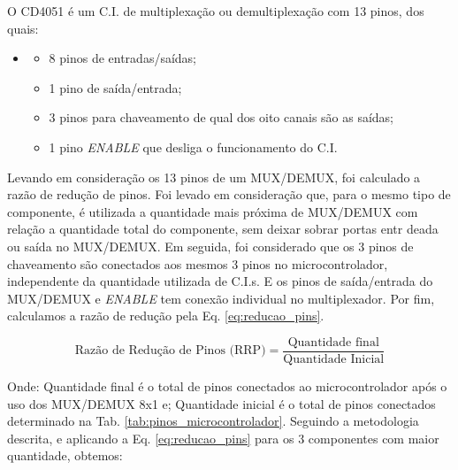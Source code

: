     O CD4051 é um C.I. de multiplexação ou demultiplexação com 13 pinos, dos quais: 
    
    \begin{itemize}
    	\item[]
    	\begin{itemize}
    		\item 8 pinos de entradas/saídas;
    		\item 1 pino de saída/entrada;
    		\item 3 pinos para chaveamento de qual dos oito canais são as saídas;
    		\item 1 pino \textit{ENABLE} que desliga o funcionamento do C.I.
    	\end{itemize}
    \end{itemize}
    
    
    Levando em consideração os 13 pinos de um MUX/DEMUX, foi calculado a razão de redução de pinos. Foi levado em consideração que, para o mesmo tipo de componente, é utilizada a quantidade mais próxima de MUX/DEMUX com relação a quantidade total do componente, sem deixar sobrar portas entr deada ou saída no MUX/DEMUX. Em seguida, foi considerado que os 3 pinos de chaveamento são conectados aos mesmos 3 pinos no microcontrolador, independente da quantidade utilizada de C.I.s. E os pinos de saída/entrada do MUX/DEMUX e \textit{ENABLE} tem conexão individual no multiplexador. Por fim, calculamos a razão de redução pela Eq. \ref{eq:reducao_pins}.
    
    \begin{equation}\label{eq:reducao_pins}
        \text{Razão de Redução de Pinos (RRP)} = \frac{\text{Quantidade final}}{\text{Quantidade Inicial}}
    \end{equation}
    
    Onde: Quantidade final é o total de pinos conectados ao microcontrolador após o uso dos MUX/DEMUX 8x1 e; Quantidade inicial é o total de pinos conectados determinado na Tab. \ref{tab:pinos_microcontrolador}. Seguindo a metodologia descrita, e aplicando a Eq. \ref{eq:reducao_pins} para os 3 componentes com maior quantidade, obtemos:
    
